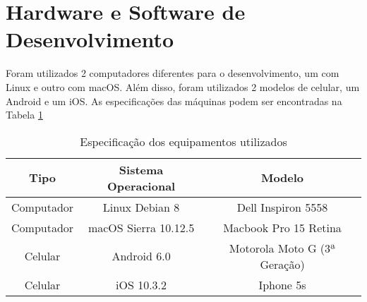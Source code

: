 \section{Hardware e Software de Desenvolvimento}

Foram utilizados 2 computadores diferentes para o desenvolvimento, um com Linux e outro com macOS. Além disso, foram utilizados 2 modelos de celular, um Android e um iOS. As especificações das máquinas podem ser encontradas na Tabela \ref{tab-hardware}

\begin{table}[h]
    \centering
    \caption{Especificação dos equipamentos utilizados}
    \label{tab-hardware}
    \begin{tabular}{|c|c|c|}\hline
        \textbf{Tipo} & \textbf{Sistema Operacional} & \textbf{Modelo}              \\ \hline
        Computador    & Linux Debian 8               & Dell Inspiron 5558           \\ \hline
        Computador    & macOS Sierra 10.12.5         & Macbook Pro 15 Retina        \\ \hline
        Celular       & Android 6.0                  & Motorola Moto G (3ª Geração) \\ \hline
        Celular       & iOS 10.3.2                   & Iphone 5s                    \\ \hline
    \end{tabular}
\end{table}
